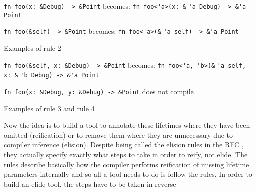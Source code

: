 \begin{fig}
{\verb|fn foo(x: &Debug) -> &Point|}\newline
becomes: {\verb|fn foo<'a>(x: &|}
{\color{red} \verb|'a|}{\verb| Debug) -> &|}{\color{blue}\verb|'a|}{\verb| Point|}

\vspace{4mm}

{\verb|fn foo(&self) -> &Point|}\newline
becomes: {\verb|fn foo<'a>(&|}
{\color{green} \verb|'a|}{\verb| self) -> &|}{\color{blue}\verb|'a|}{\verb| Point|}

\caption{Examples of rule 2}
\label{Fig:lifetimes3}
\end{fig}

\begin{fig}
{\verb|fn foo(&self, x: &Debug) -> &Point|}\newline
becomes: {\verb|fn foo<'a, 'b>(&|}
{\color{green} \verb|'a|}{\verb| self, x: &|}{\color{red} \verb|'b|}{\verb| Debug) -> &|}{\color{blue}\verb|'a|}{\verb| Point|}


\vspace{4mm}
{\verb|fn foo(x: &Debug, y: &Debug) -> &Point|}\newline
does not compile

\caption{Examples of rule 3 and rule 4}
\label{Fig:lifetimes4}
\end{fig}

Now the idea is to build a tool to annotate these lifetimes where they have been omitted (reification) or to remove them where they are unnecessary due to compiler inference (elision). Despite being called the elision rules in the RFC \cite{elisionrules}, they actually specify exactly what steps to take in order to reify, not elide. The rules describe basically how the compiler performs reification of missing lifetime parameters internally and so all a tool needs to do is follow the rules. In order to build an elide tool, the steps have to be taken in reverse 


